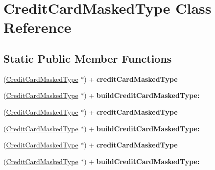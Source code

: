 \hypertarget{interface_credit_card_masked_type}{
\section{CreditCardMaskedType Class Reference}
\label{interface_credit_card_masked_type}
}
\subsection*{Static Public Member Functions}
\begin{DoxyCompactItemize}
\item 
\hypertarget{interface_credit_card_masked_type_ada5cecd9d11f8bd32a6b9779d4b17bbb}{
(\hyperlink{interface_credit_card_masked_type}{CreditCardMaskedType} $\ast$) + {\bfseries creditCardMaskedType}}
\label{interface_credit_card_masked_type_ada5cecd9d11f8bd32a6b9779d4b17bbb}

\item 
\hypertarget{interface_credit_card_masked_type_a19a5a1cfca1584026009034858f126eb}{
(\hyperlink{interface_credit_card_masked_type}{CreditCardMaskedType} $\ast$) + {\bfseries buildCreditCardMaskedType:}}
\label{interface_credit_card_masked_type_a19a5a1cfca1584026009034858f126eb}

\item 
\hypertarget{interface_credit_card_masked_type_ada5cecd9d11f8bd32a6b9779d4b17bbb}{
(\hyperlink{interface_credit_card_masked_type}{CreditCardMaskedType} $\ast$) + {\bfseries creditCardMaskedType}}
\label{interface_credit_card_masked_type_ada5cecd9d11f8bd32a6b9779d4b17bbb}

\item 
\hypertarget{interface_credit_card_masked_type_a19a5a1cfca1584026009034858f126eb}{
(\hyperlink{interface_credit_card_masked_type}{CreditCardMaskedType} $\ast$) + {\bfseries buildCreditCardMaskedType:}}
\label{interface_credit_card_masked_type_a19a5a1cfca1584026009034858f126eb}

\item 
\hypertarget{interface_credit_card_masked_type_ada5cecd9d11f8bd32a6b9779d4b17bbb}{
(\hyperlink{interface_credit_card_masked_type}{CreditCardMaskedType} $\ast$) + {\bfseries creditCardMaskedType}}
\label{interface_credit_card_masked_type_ada5cecd9d11f8bd32a6b9779d4b17bbb}

\item 
\hypertarget{interface_credit_card_masked_type_a19a5a1cfca1584026009034858f126eb}{
(\hyperlink{interface_credit_card_masked_type}{CreditCardMaskedType} $\ast$) + {\bfseries buildCreditCardMaskedType:}}
\label{interface_credit_card_masked_type_a19a5a1cfca1584026009034858f126eb}

\end{DoxyCompactItemize}
